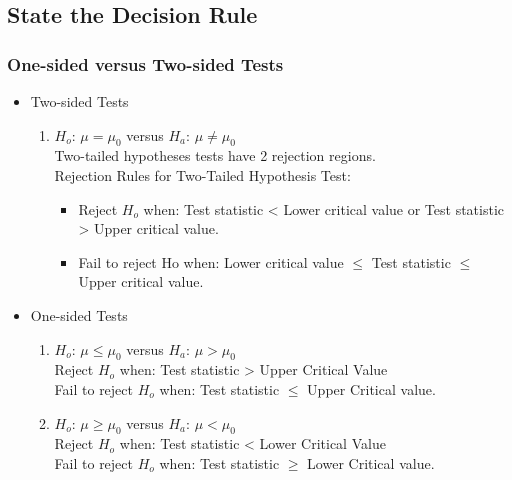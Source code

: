 \subsection{State the Decision Rule} %
\label{sub:State the Decision Rule}
\subsubsection{One-sided versus Two-sided Tests} %
\label{ssub:One-sided versus Two-sided Tests}
\begin{itemize}
	\item Two-sided Tests
	      \begin{enumerate}
		      \item[] $H_o$: $\mu = \mu_0$ versus $H_a$: $\mu \neq \mu_0$\\
		            Two-tailed hypotheses tests have 2 rejection regions.\\
		            Rejection Rules for Two-Tailed Hypothesis Test:
		            \begin{itemize}
			            \item[] Reject $H_o$ when: Test statistic < Lower critical value or Test statistic > Upper critical value.
			            \item[] Fail to reject Ho when: Lower critical value $\leq$ Test statistic $\leq$ Upper critical value.
		            \end{itemize}
	      \end{enumerate}
	\item One-sided Tests
	      \begin{enumerate}
		      \item $H_o$: $\mu \leq \mu_0$ versus $H_a$: $\mu > \mu_0$\\
		            Reject $H_o$ when: Test statistic > Upper Critical Value\\
		            Fail to reject $H_o$ when: Test statistic $\leq$ Upper Critical value.
		      \item $H_o$: $\mu \geq \mu_0$ versus $H_a$: $\mu < \mu_0$\\
		            Reject $H_o$ when: Test statistic < Lower Critical Value\\
		            Fail to reject $H_o$ when: Test statistic $\geq$ Lower Critical value.
	      \end{enumerate}
\end{itemize}
